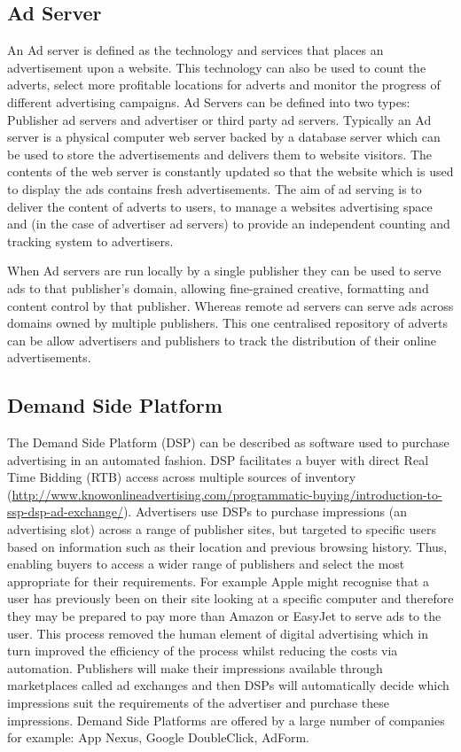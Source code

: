 \documentclass{article}
\begin{document}
\subsection{Ad Server}
An Ad server is defined as the technology and services that places an advertisement upon a website. This technology can also be used to count the adverts, select more profitable locations for adverts and monitor the progress of different advertising campaigns. Ad Servers can be defined into two types: Publisher ad servers and advertiser or third party ad servers. \newline 
Typically an Ad server is a physical computer web server backed by a database server which can be used to store the advertisements and delivers them to website visitors. The contents of the web server is constantly updated so that the website which is used to display the ads contains fresh advertisements. The aim of ad serving is to deliver the content of adverts to users, to manage a websites advertising space and (in the case of advertiser ad servers) to provide an independent counting and tracking system to advertisers. \newline 

When Ad servers are run locally by a single publisher they can be used to serve ads to that publisher's domain, allowing fine-grained creative, formatting and content control by that publisher. Whereas remote ad servers can serve ads across domains owned by multiple publishers. This one centralised repository of adverts can be allow advertisers and publishers to track the distribution of their online advertisements. 
\newline

\subsection{Demand Side Platform} \label{DSP}
The Demand Side Platform (DSP) can be described as software used to purchase advertising in an automated fashion. DSP facilitates a buyer with direct Real Time Bidding (RTB) access across multiple sources of inventory (\url{http://www.knowonlineadvertising.com/programmatic-buying/introduction-to-ssp-dsp-ad-exchange/}). Advertisers use DSPs to purchase impressions (an advertising slot) across a range of publisher sites, but targeted to specific users based on information such as their location and previous browsing history. Thus, enabling buyers to access a wider range of publishers and select the most appropriate for their requirements. For example Apple might recognise that a user has previously been on their site looking at a specific computer and therefore they may be prepared to pay more than Amazon or EasyJet to serve ads to the user. This process removed the human element of digital advertising which in turn improved the efficiency of the process whilst reducing the costs via automation. Publishers will make their impressions available through marketplaces called ad exchanges and then DSPs will automatically decide which impressions suit the requirements of the advertiser and purchase these impressions. Demand Side Platforms are offered by a large number of companies for example: App Nexus, Google DoubleClick, AdForm. 
\end{document}
